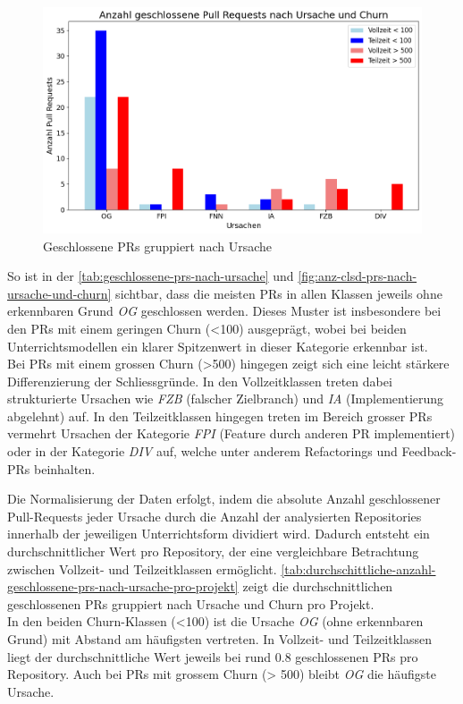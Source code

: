 \begin{figure}[htbp]
    \includegraphics[width=\textwidth]{Figures/ursachenanalyse.png}
    \caption{Geschlossene PRs gruppiert nach Ursache}
    \label{fig:anz-clsd-prs-nach-ursache-und-churn}
\end{figure}
So ist in der \autoref{tab:geschlossene-prs-nach-ursache} und \autoref{fig:anz-clsd-prs-nach-ursache-und-churn} sichtbar, dass die meisten PRs in allen Klassen jeweils ohne erkennbaren Grund \textit{OG} geschlossen werden. Dieses Muster ist insbesondere bei den PRs mit einem geringen Churn (<100) ausgeprägt, wobei bei beiden Unterrichtsmodellen ein klarer Spitzenwert in dieser Kategorie erkennbar ist. \\
Bei PRs mit einem grossen Churn (>500) hingegen zeigt sich eine leicht stärkere Differenzierung der Schliessgründe.
In den Vollzeitklassen treten dabei strukturierte Ursachen wie \textit{FZB} (falscher Zielbranch) und \textit{IA} (Implementierung abgelehnt) auf. 
In den Teilzeitklassen hingegen treten im Bereich grosser PRs vermehrt Ursachen der Kategorie \textit{FPI} (Feature durch anderen PR implementiert) oder in der Kategorie \textit{DIV} auf, welche unter anderem Refactorings und Feedback-PRs beinhalten.


Die Normalisierung der Daten erfolgt, indem die absolute Anzahl geschlossener Pull-Requests jeder Ursache durch die Anzahl der analysierten Repositories innerhalb der jeweiligen Unterrichtsform dividiert wird. Dadurch entsteht ein durchschnittlicher Wert pro Repository, der eine vergleichbare Betrachtung zwischen Voll\-zeit- und Teilzeitklassen ermöglicht. \autoref{tab:durchschittliche-anzahl-geschlossene-prs-nach-ursache-pro-projekt} zeigt die durchschnittlichen geschlossenen PRs gruppiert nach Ursache und Churn pro Projekt.  \\
In den beiden Churn-Klassen (<100) ist die Ursache \textit{OG} (ohne erkennbaren Grund) mit Abstand am häufigsten vertreten. In Vollzeit- und Teilzeitklassen liegt der durchschnittliche Wert jeweils bei rund 0.8 geschlossenen PRs pro Repository. Auch bei PRs mit grossem Churn (> 500) bleibt \textit{OG} die häufigste Ursache.

